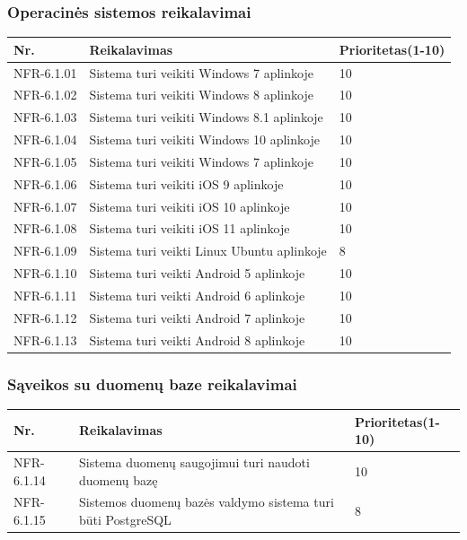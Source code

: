 \documentclass[oneside]{VUMIFPSkursinis}
\begin{document}
\subsubsection{Operacinės sistemos reikalavimai}
\begin{table}[htbp]
	\begin{tabularx}{1\textwidth}{ |P{2.5cm}|X|P{3cm }| }  \hline
		Nr. & Reikalavimas & Prioritetas(1-10) \\ \hline
		NFR-6.1.01 & Sistema turi veikiti Windows 7 aplinkoje & 10 \\ \hline
		NFR-6.1.02 & Sistema turi veikiti Windows 8 aplinkoje & 10 \\ \hline
		NFR-6.1.03 & Sistema turi veikiti Windows 8.1 aplinkoje & 10 \\ \hline
		NFR-6.1.04 & Sistema turi veikiti Windows 10 aplinkoje & 10 \\ \hline
		NFR-6.1.05 & Sistema turi veikiti Windows 7 aplinkoje & 10 \\ \hline
		NFR-6.1.06 & Sistema turi veikiti iOS 9 aplinkoje & 10 \\ \hline
		NFR-6.1.07 & Sistema turi veikiti iOS 10 aplinkoje & 10 \\ \hline
		NFR-6.1.08 & Sistema turi veikiti iOS 11 aplinkoje & 10 \\ \hline
		NFR-6.1.09 & Sistema turi veikti Linux Ubuntu aplinkoje & 8 \\ \hline
		NFR-6.1.10 & Sistema turi veikti Android 5 aplinkoje & 10 \\ \hline
		NFR-6.1.11 & Sistema turi veikti Android 6 aplinkoje & 10 \\ \hline
		NFR-6.1.12 & Sistema turi veikti Android 7 aplinkoje & 10 \\ \hline
		NFR-6.1.13 & Sistema turi veikti Android 8 aplinkoje & 10 \\ \hline
		 
	\end{tabularx}
\end{table}

\subsubsection{Sąveikos su duomenų baze reikalavimai}
\begin{table}[htbp]
	\begin{tabularx}{1\textwidth}{ |P{2.5cm}|X|P{3cm }| }  \hline
		Nr. & Reikalavimas & Prioritetas(1-10) \\ \hline
		NFR-6.1.14 & Sistema duomenų saugojimui turi naudoti duomenų bazę  & 10\\ \hline
		NFR-6.1.15 & Sistemos duomenų bazės valdymo sistema turi būti PostgreSQL & 8   \\ \hline
	\end{tabularx}
\end{table}
\end{document}
